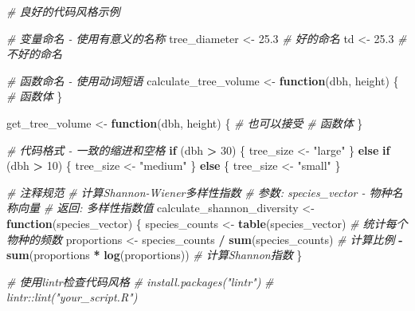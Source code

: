 \documentclass[
  twoside]{book}
\newenvironment{Shaded}{\begin{snugshade}}{\end{snugshade}}
\newcommand{\CommentTok}[1]{\textcolor[rgb]{0.56,0.35,0.01}{\textit{#1}}}
\newcommand{\ControlFlowTok}[1]{\textcolor[rgb]{0.13,0.29,0.53}{\textbf{#1}}}
\newcommand{\DecValTok}[1]{\textcolor[rgb]{0.00,0.00,0.81}{#1}}
\newcommand{\FloatTok}[1]{\textcolor[rgb]{0.00,0.00,0.81}{#1}}
\newcommand{\FunctionTok}[1]{\textcolor[rgb]{0.13,0.29,0.53}{\textbf{#1}}}
\newcommand{\NormalTok}[1]{#1}
\newcommand{\OtherTok}[1]{\textcolor[rgb]{0.56,0.35,0.01}{#1}}
\newcommand{\SpecialCharTok}[1]{\textcolor[rgb]{0.81,0.36,0.00}{\textbf{#1}}}
\newcommand{\StringTok}[1]{\textcolor[rgb]{0.31,0.60,0.02}{#1}}
\begin{document}
\begin{Shaded}
\begin{Highlighting}[]
\CommentTok{\# 良好的代码风格示例}

\CommentTok{\# 变量命名 {-} 使用有意义的名称}
\NormalTok{tree\_diameter }\OtherTok{\textless{}{-}} \FloatTok{25.3}  \CommentTok{\# 好的命名}
\NormalTok{td }\OtherTok{\textless{}{-}} \FloatTok{25.3}            \CommentTok{\# 不好的命名}

\CommentTok{\# 函数命名 {-} 使用动词短语}
\NormalTok{calculate\_tree\_volume }\OtherTok{\textless{}{-}} \ControlFlowTok{function}\NormalTok{(dbh, height) \{}
  \CommentTok{\# 函数体}
\NormalTok{\}}

\NormalTok{get\_tree\_volume }\OtherTok{\textless{}{-}} \ControlFlowTok{function}\NormalTok{(dbh, height) \{  }\CommentTok{\# 也可以接受}
  \CommentTok{\# 函数体}
\NormalTok{\}}

\CommentTok{\# 代码格式 {-} 一致的缩进和空格}
\ControlFlowTok{if}\NormalTok{ (dbh }\SpecialCharTok{\textgreater{}} \DecValTok{30}\NormalTok{) \{}
\NormalTok{  tree\_size }\OtherTok{\textless{}{-}} \StringTok{"large"}
\NormalTok{\} }\ControlFlowTok{else} \ControlFlowTok{if}\NormalTok{ (dbh }\SpecialCharTok{\textgreater{}} \DecValTok{10}\NormalTok{) \{}
\NormalTok{  tree\_size }\OtherTok{\textless{}{-}} \StringTok{"medium"}
\NormalTok{\} }\ControlFlowTok{else}\NormalTok{ \{}
\NormalTok{  tree\_size }\OtherTok{\textless{}{-}} \StringTok{"small"}
\NormalTok{\}}

\CommentTok{\# 注释规范}
\CommentTok{\# 计算Shannon{-}Wiener多样性指数}
\CommentTok{\# 参数: species\_vector {-} 物种名称向量}
\CommentTok{\# 返回: 多样性指数值}
\NormalTok{calculate\_shannon\_diversity }\OtherTok{\textless{}{-}} \ControlFlowTok{function}\NormalTok{(species\_vector) \{}
\NormalTok{  species\_counts }\OtherTok{\textless{}{-}} \FunctionTok{table}\NormalTok{(species\_vector)  }\CommentTok{\# 统计每个物种的频数}
\NormalTok{  proportions }\OtherTok{\textless{}{-}}\NormalTok{ species\_counts }\SpecialCharTok{/} \FunctionTok{sum}\NormalTok{(species\_counts)  }\CommentTok{\# 计算比例}
  \SpecialCharTok{{-}}\FunctionTok{sum}\NormalTok{(proportions }\SpecialCharTok{*} \FunctionTok{log}\NormalTok{(proportions))  }\CommentTok{\# 计算Shannon指数}
\NormalTok{\}}

\CommentTok{\# 使用lintr检查代码风格}
\CommentTok{\# install.packages("lintr")}
\CommentTok{\# lintr::lint("your\_script.R")}
\end{Highlighting}
\end{Shaded}
\end{document}
